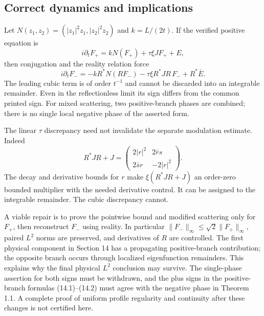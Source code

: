 \documentclass[10pt]{article}
\begin{document}
\subsection*{Correct dynamics and implications}
Let \(N(z_1,z_2)=(|z_1|^2z_1,|z_2|^2z_2)\) and \(k=L/(2t)\). If the verified positive equation is \[i\partial_tF_+=kN(F_+)+\tau\xi JF_++E,\] then conjugation and the reality relation force \[i\partial_tF_-=
 -kR^*N(RF_-)-\tau\xi R^*JR\,F_-+R^*\bar E .
 \tag{2}\] The leading cubic term is of order \(t^{-1}\) and cannot be discarded into an integrable remainder. Even in the reflectionless limit its sign differs from the common printed sign. For mixed scattering, two positive-branch phases are combined; there is no single local negative phase of the asserted form.\par
The linear \(\tau\) discrepancy need not invalidate the separate modulation estimate. Indeed \[R^*JR+J=
 \begin{pmatrix}2|r|^2&2\bar r s\\2\bar s r&-2|r|^2\end{pmatrix}.\] The decay and derivative bounds for \(r\) make \(\xi(R^*JR+J)\) an order-zero bounded multiplier with the needed derivative control. It can be assigned to the integrable remainder. The cubic discrepancy cannot.\par
A viable repair is to prove the pointwise bound and modified scattering only for \(F_+\), then reconstruct \(F_-\) using reality. In particular \(\|F_-\|_\infty\le\sqrt2\|F_+\|_\infty\), paired \(L^2\) norms are preserved, and derivatives of \(R\) are controlled. The first physical component in Section 14 has a propagating positive-branch contribution; the opposite branch occurs through localized eigenfunction remainders. This explains why the final physical \(L^2\) conclusion may survive. The single-phase assertion for both signs must be withdrawn, and the plus signs in the positive-branch formulas (14.1)–(14.2) must agree with the negative phase in Theorem 1.1. A complete proof of uniform profile regularity and continuity after these changes is not certified here.\par
\end{document}
